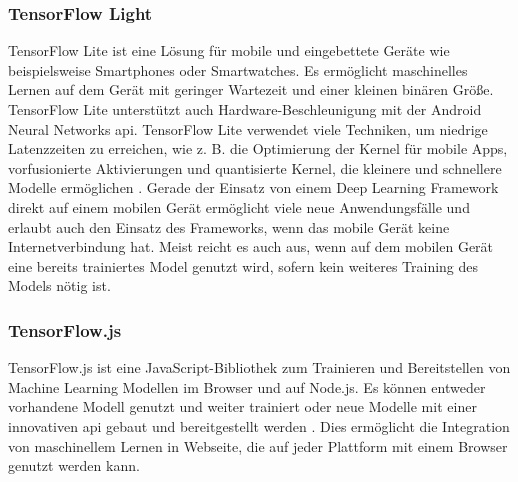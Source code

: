 \subsubsection{TensorFlow Light}
TensorFlow Lite ist eine Lösung für mobile und eingebettete Geräte wie beispielsweise Smartphones oder Smartwatches. Es ermöglicht maschinelles Lernen auf dem Gerät mit geringer Wartezeit und einer kleinen binären Größe. TensorFlow Lite unterstützt auch Hardware-Beschleunigung mit der Android Neural Networks \ac{api}. TensorFlow Lite verwendet viele Techniken, um niedrige Latenzzeiten zu erreichen, wie z. B. die Optimierung der Kernel für mobile Apps, vorfusionierte Aktivierungen und quantisierte Kernel, die kleinere und schnellere Modelle ermöglichen \cite{tensorflow}. Gerade der Einsatz von einem Deep Learning Framework direkt auf einem mobilen Gerät ermöglicht viele neue Anwendungsfälle und erlaubt auch den Einsatz des Frameworks, wenn das mobile Gerät keine Internetverbindung hat. Meist reicht es auch aus, wenn auf dem mobilen Gerät eine bereits trainiertes Model genutzt wird, sofern kein weiteres Training des Models nötig ist. 

\subsubsection{TensorFlow.js}
TensorFlow.js ist eine JavaScript-Bibliothek zum Trainieren und Bereitstellen von Machine Learning Modellen im Browser und auf Node.js. Es können entweder vorhandene Modell genutzt und weiter trainiert oder neue Modelle mit einer innovativen \ac{api} gebaut und bereitgestellt werden \cite{tensorflowjs}. Dies ermöglicht die Integration von maschinellem Lernen in Webseite, die auf jeder Plattform mit einem Browser genutzt werden kann.

